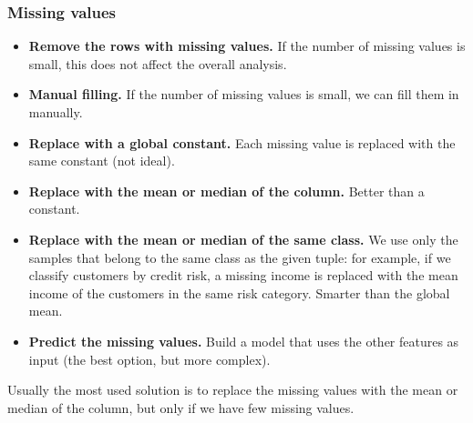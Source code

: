 \subsubsection{Missing values}
\begin{itemize}
    \item \textbf{Remove the rows with missing values.} If the number of missing values is small, this does not affect the overall analysis.
    \item \textbf{Manual filling.} If the number of missing values is small, we can fill them in manually.
    \item \textbf{Replace with a global constant.} Each missing value is replaced with the same constant (not ideal).
    \item \textbf{Replace with the mean or median of the column.} Better than a constant.
    \item \textbf{Replace with the mean or median of the same class.} We use only the samples that belong to the same class as the given tuple: for example, if we classify customers by credit risk, a missing income is replaced with the mean income of the customers in the same risk category. Smarter than the global mean.
    \item \textbf{Predict the missing values.} Build a model that uses the other features as input (the best option, but more complex).
\end{itemize}
Usually the most used solution is to replace the missing values with the mean or median of the column, but only if we have few missing values.

